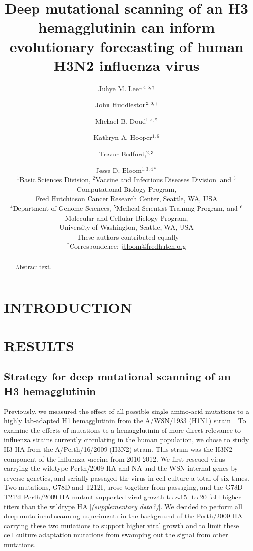 \documentclass[11pt]{article}
\title{Deep mutational scanning of an H3 hemagglutinin can inform evolutionary forecasting of human H3N2 influenza virus}
\author{
Juhye M. Lee$^{1,4,5,\dagger}$ \and 
John Huddleston$^{2,6,\dagger}$ \and 
Michael B. Doud$^{1,4,5}$ \and 
Kathryn A. Hooper$^{1,6}$ \and
Trevor Bedford,$^{2,3}$ \and 
Jesse D. Bloom$^{1,3,4*}$
\\
\scriptsize{$^1$Basic Sciences Division, $^2$Vaccine and Infectious Diseases Division, and $^3$Computational Biology Program,} \\
\scriptsize{Fred Hutchinson Cancer Research Center, Seattle, WA, USA} \\
\scriptsize{$^4$Department of Genome Sciences, $^5$Medical Scientist Training Program, and $^6$Molecular and Cellular Biology Program,} \\
\scriptsize{University of Washington, Seattle, WA, USA} \\
\scriptsize{$^{\dagger}$These authors contributed equally} \\
\scriptsize{$^*$Correspondence: \href{jbloom@fredhutch.org}{jbloom@fredhutch.org}}
}
\date{}
\newcommand{\comment}[1]{{\color{red}[\textsl{#1}]}}
\begin{document}
\maketitle
\onehalfspacing

\begin{abstract}
Abstract text.
\end{abstract}

\section*{INTRODUCTION}

\section*{RESULTS}
\label{sec:results}

\subsection*{Strategy for deep mutational scanning of an H3 hemagglutinin}
Previously, we measured the effect of all possible single amino-acid mutations to a highly lab-adapted H1 hemagglutinin from the A/WSN/1933 (H1N1) strain~\citep{thyagarajan2014inherent,doud2016accurate}. 
To examine the effects of mutations to a hemagglutinin of more direct relevance to influenza strains currently circulating in the human population, we chose to study H3 HA from the A/Perth/16/2009 (H3N2) strain. 
This strain was the H3N2 component of the influenza vaccine from 2010-2012.
We first rescued virus carrying the wildtype Perth/2009 HA and NA and the WSN internal genes by reverse genetics, and serially passaged the virus in cell culture a total of six times.
Two mutations, G78D and T212I, arose together from passaging, and the G78D-T212I Perth/2009 HA mutant supported viral growth to $\sim$15- to 20-fold higher titers than the wildtype HA \comment{(supplementary data?)}.
We decided to perform all deep mutational scanning experiments in the background of the Perth/2009 HA carrying these two mutations to support higher viral growth and to limit these cell culture adaptation mutations from swamping out the signal from other mutations.
\end{document}
